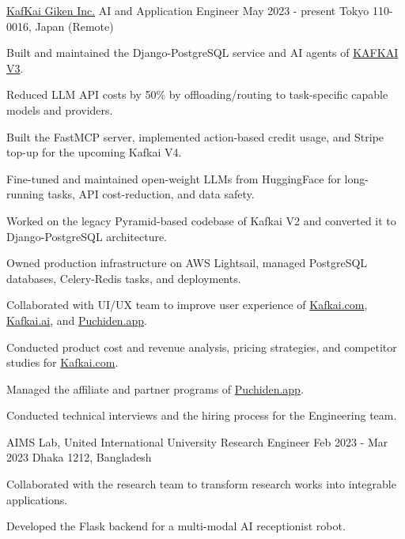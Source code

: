 \begin{cventries}
\cventry
    {\href{https://kafkai.com/}{KafKai Giken Inc.}} %
    {AI and Application Engineer} %
    {May 2023 - present} %
    {Tokyo 110-0016, Japan (Remote)} %
    {
      \begin{cvitems} %
        \item{Built and maintained the Django-PostgreSQL service and AI agents of \href{https://kafkai.com/}{\textcolor{Cerulean}{KAFKAI V3}}.}
        \item{Reduced LLM API costs by 50\% by offloading/routing to task-specific capable models and providers.}
        \item{Built the FastMCP server, implemented action-based credit usage, and Stripe top-up for the upcoming Kafkai V4.}
        \item{Fine-tuned and maintained open-weight LLMs from HuggingFace for long-running tasks, API cost-reduction, and data safety.}
        \item{Worked on the legacy Pyramid-based codebase of Kafkai V2 and converted it to Django-PostgreSQL architecture.}
        \item{Owned production infrastructure on AWS Lightsail, managed PostgreSQL databases, Celery-Redis tasks, and deployments.}
        \item{Collaborated with UI/UX team to improve user experience of \href{https://kafkai.com/}{\textcolor{Cerulean}{Kafkai.com}}, \href{https://kafkai.ai/}{\textcolor{Cerulean}{Kafkai.ai}}, and \href{https://puchiden.app/}{\textcolor{Cerulean}{Puchiden.app}}.}
        \item{Conducted product cost and revenue analysis, pricing strategies, and competitor studies for \href{https://kafkai.com/}{\textcolor{Cerulean}{Kafkai.com}}.}
        \item{Managed the affiliate and partner programs of \href{https://puchiden.app/}{\textcolor{Cerulean}{Puchiden.app}}.}
        \item{Conducted technical interviews and the hiring process for the Engineering team.}
      \end{cvitems}
    }


\cventry
  {AIMS Lab, United International University} %
  {Research Engineer} %
  {Feb 2023 - Mar 2023} %
  {Dhaka 1212, Bangladesh} %
{
  \begin{cvitems}
    \item{Collaborated with the research team to transform research works into integrable applications.}
    \item{Developed the Flask backend for a multi-modal AI receptionist robot.}
  \end{cvitems}
}


\end{cventries}
